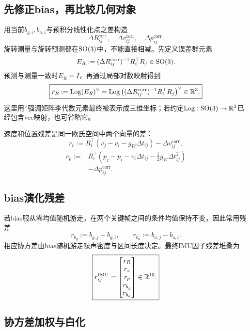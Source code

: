 \subsection{先修正bias，再比较几何对象}

用当前$b_{g,i},b_{a,i}$与预积分线性化点之差构造
\[
    \Delta R_{ij}^{\mathrm{corr}},
    \quad
    \Delta v_{ij}^{\mathrm{corr}},
    \quad
    \Delta p_{ij}^{\mathrm{corr}}.
\]
旋转测量与旋转预测都在$\operatorname{SO}(3)$中，不能直接相减。先定义误差群元素
\[
    E_R
    :=(\Delta R_{ij}^{\mathrm{corr}})^{-1}
      R_i^\top R_j
    \in\operatorname{SO}(3).
\]
预测与测量一致时$E_R=I$，再通过局部对数映射得到
\[
\boxed{
    r_R
    :=\operatorname{Log}(E_R)^\vee
    =\operatorname{Log}\left(
      (\Delta R_{ij}^{\mathrm{corr}})^{-1}R_i^\top R_j
    \right)^\vee
    \in\mathbb{R}^3.
}
\]
这里用$^\vee$强调矩阵李代数元素最终被表示成三维坐标；若约定$\operatorname{Log}:\operatorname{SO}(3)\to\mathbb{R}^3$已经包含vee映射，也可省略它。

速度和位置残差是同一欧氏空间中两个向量的差：
\[
\boxed{
    r_v
    :=R_i^\top(v_j-v_i-g_W\Delta t_{ij})
      -\Delta v_{ij}^{\mathrm{corr}},
}
\]
\[
\boxed{
\begin{aligned}
    r_p
    :={}&R_i^\top
      \left(
        p_j-p_i-v_i\Delta t_{ij}
        -\frac12g_W\Delta t_{ij}^2
      \right)\\
      &-\Delta p_{ij}^{\mathrm{corr}}.
\end{aligned}
}
\]

\subsection{bias演化残差}

若bias服从零均值随机游走，在两个关键帧之间的条件均值保持不变，因此常用残差
\[
\boxed{
    r_{b_g}:=b_{g,j}-b_{g,i},
    \qquad
    r_{b_a}:=b_{a,j}-b_{a,i}.
}
\]
相应协方差由bias随机游走噪声密度与区间长度决定。最终IMU因子残差堆叠为
\[
\boxed{
    r_{ij}^{\mathrm{IMU}}
    =
    \begin{bmatrix}
        r_R\\r_v\\r_p\\r_{b_g}\\r_{b_a}
    \end{bmatrix}
    \in\mathbb{R}^{15}.
}
\]

\subsection{协方差加权与白化}

